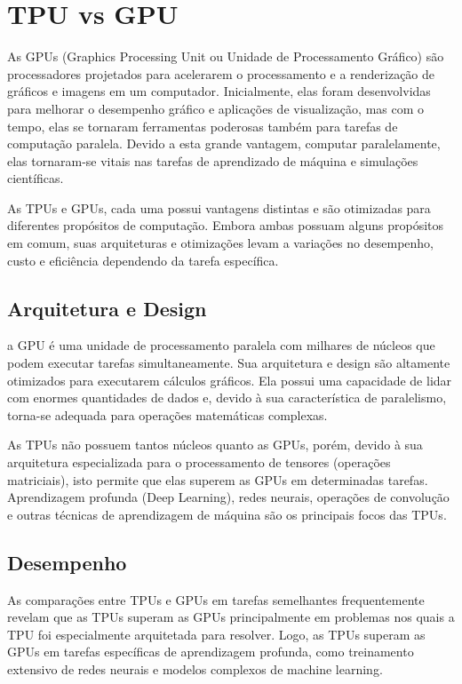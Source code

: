 \documentclass{report}
\begin{document}
\chapter{TPU vs GPU}

As GPUs (Graphics Processing Unit ou Unidade de Processamento Gráfico) são processadores projetados para acelerarem o processamento e a renderização de gráficos e imagens em um computador. Inicialmente, elas foram desenvolvidas para melhorar o desempenho gráfico e aplicações de visualização, mas com o tempo, elas se tornaram ferramentas poderosas também para tarefas de computação paralela. Devido a esta grande vantagem, computar paralelamente, elas tornaram-se vitais nas tarefas de aprendizado de máquina e simulações científicas.

As TPUs e GPUs, cada uma possui vantagens distintas e são otimizadas para diferentes propósitos de computação. Embora ambas possuam alguns propósitos em comum, suas arquiteturas e otimizações levam a variações no desempenho, custo e eficiência dependendo da tarefa específica.

\section{Arquitetura e Design}

a GPU é uma unidade de processamento paralela com milhares de núcleos que podem executar tarefas simultaneamente. Sua arquitetura e design são altamente otimizados para executarem cálculos gráficos. Ela possui uma capacidade de lidar com enormes quantidades de dados e, devido à sua característica de paralelismo, torna-se adequada para operações matemáticas complexas.

As TPUs não possuem tantos núcleos quanto as GPUs, porém, devido à sua arquitetura especializada para o processamento de tensores (operações matriciais), isto permite que elas superem as GPUs em determinadas tarefas. Aprendizagem profunda (Deep Learning), redes neurais, operações de convolução e outras técnicas de aprendizagem de máquina são os principais focos das TPUs.

\section{Desempenho}

As comparações entre TPUs e GPUs em tarefas semelhantes frequentemente revelam que as TPUs superam as GPUs principalmente em problemas nos quais a TPU foi especialmente arquitetada para resolver. Logo,  as TPUs superam as GPUs em tarefas específicas de aprendizagem profunda, como treinamento extensivo de redes neurais e modelos complexos de machine learning.
\end{document}
